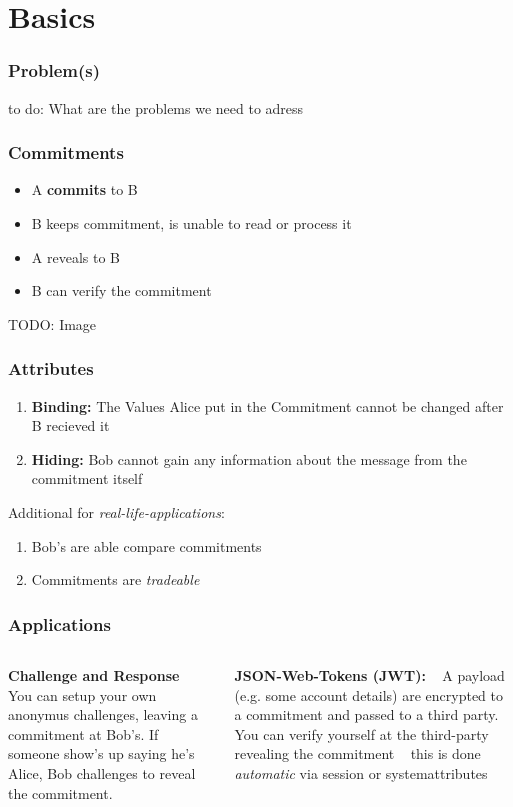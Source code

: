\section{Basics}

\begin{frame}
	\frametitle{Problem(s)}
	to do: What are the problems we need to adress
\end{frame}

\begin{frame}
	\frametitle{Commitments}
	\begin{itemize}
		\item A \textbf{commits} to B
		\item B keeps commitment, is unable to read or process it
		\item A reveals to B
		\item B can verify the commitment 
	\end{itemize}
TODO: Image
\end{frame}

\begin{frame}
	\frametitle{Attributes}
	\begin{enumerate}
		\item \textbf{Binding:} The Values Alice put in the Commitment cannot be changed after B recieved it 
		\item \textbf{Hiding:} Bob cannot gain any information about the message from the commitment itself
	\end{enumerate}
	Additional for \textit{real-life-applications}:
	\begin{enumerate}
		\item Bob's are able compare commitments
		\item Commitments are \textit{tradeable}
	\end{enumerate}
\end{frame}

\begin{frame}
	\frametitle{Applications}
	\begin{columns}
		\begin{column}{0.5\textwidth}
			\textbf{Challenge and Response} ~\newline
			You can setup your own anonymus challenges, leaving a commitment at Bob's. If someone show's up saying he's Alice, Bob challenges to reveal the commitment.
		\end{column}
		\begin{column}{0.5\textwidth}
			\textbf{JSON-Web-Tokens (JWT):} ~\newline
			A payload (e.g. some account details) are encrypted to a commitment and passed to a third party. ~\newline 
			You can verify yourself at the third-party revealing the commitment ~\newline 
			this is done \textit{automatic} via session or systemattributes 
		\end{column}
	\end{columns}
\end{frame}